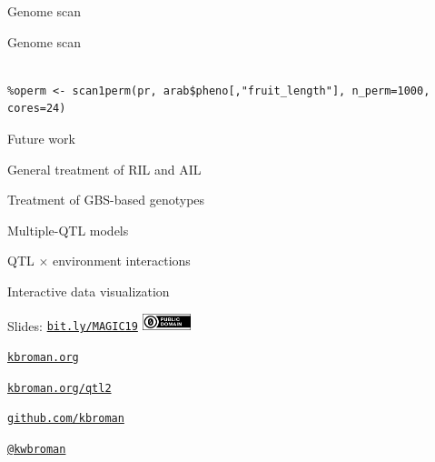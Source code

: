 \documentclass[12pt,t,aspectratio=1610]{beamer}
\begin{document}
\begin{frame}[c]{Genome scan}


\end{frame}


\begin{frame}[c,fragile]{Genome scan}
\addtocounter{framenumber}{-1}

\begin{center} \begin{minipage}[c]{11.5cm} \begin{semiverbatim}
\begin{lstlisting}[linewidth=11.5cm]
%out <- scan1(pr, arab$pheno[,"fruit_length"], cores=24)

%operm <- scan1perm(pr, arab$pheno[,"fruit_length"], n_perm=1000, cores=24)
\end{lstlisting}
\end{semiverbatim} \end{minipage} \end{center}

\end{frame}





\begin{frame}{Future work}

  \bbi
\item General treatment of RIL and AIL

\item Treatment of GBS-based genotypes

\item Multiple-QTL models

\item QTL $\times$ environment interactions

\item Interactive data visualization
  \ei

\end{frame}




\begin{frame}[c]{}

\Large

Slides: \href{https://bit.ly/MAGIC19}{\tt bit.ly/MAGIC19} \quad
\includegraphics[height=5mm]{Figs/cc-zero.png}

\vspace{7mm}

\href{https://kbroman.org}{\tt \lolit kbroman.org}

\vspace{7mm}

\href{https://kbroman.org/qtl2}{\tt kbroman.org/qtl2}

\vspace{7mm}

\href{https://github.com/kbroman}{\tt \lolit github.com/kbroman}

\vspace{7mm}

\href{https://twitter.com/kwbroman}{\tt \lolit @kwbroman}


\end{frame}
\end{document}
